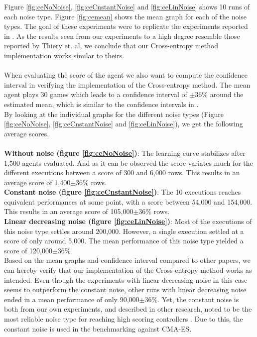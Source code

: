Figure \ref{fig:ceNoNoise}, \ref{fig:ceCnstantNoise} and
\ref{fig:ceLinNoise} shows 10 runs of each noise type. Figure
\ref{fig:cemean} shows the mean graph for each of the noise types.
The goal of these experiments were to replicate the experiments 
reported in \citep{thiery:09}. As the results seen from our experiments
to a high degree resemble those reported by Thiery et. al, we conclude
that our Cross-entropy method implementation works similar to theirs.\\
\\
When evaluating the score of the agent we also want to compute the confidence
interval in verifying the implementation of the Cross-entropy method. The mean agent plays 30 games
which leads to a confidence interval of $\pm36\%$ around the estimated mean,
which is similar to the confidence intervals in \citep{scherrer2009}.\\
By looking at the individual graphs for the different noise types 
(Figure \ref{fig:ceNoNoise}, \ref{fig:ceCnstantNoise} and
\ref{fig:ceLinNoise}), we get the following average scores.\\
\\
\textbf{Without noise (figure \ref{fig:ceNoNoise})}: The learning curve
stabilizes after 1,500 agents evaluated. And as it can be observed the
score variates much for the different executions between a score of 300 and 6,000
rows. This results in an average score of 1,400$\pm36\%$ rows.\\
\textbf{Constant noise (figure \ref{fig:ceCnstantNoise})}: 
The 10 executions reaches equivalent performances at some point, 
with a score between
54,000 and 154,000. This results in an average score of 105,000$\pm36\%$ rows.\\
\textbf{Linear decreasing noise (figure \ref{fig:ceLinNoise})}:
Most of the executions of this noise type settles around 200,000.
However, a single execution settled at a score of only around 5,000.
The mean performance of this noise type yielded a score of
120,000$\pm36\%$ \\

Based on the mean graphs and confidence interval compared to other papers, we can
hereby verify that our implementation of the Cross-entropy method works as intended. Even though the
experiments with linear decreasing noise in this case seems to outperform
the constant noise, other runs with linear decreasing noise ended in a mean 
performance of only 90,000$\pm36\%$. Yet, the constant noise is both from our
own experiments, and described in other research, noted to be the most reliable
noise type for reaching high scoring controllers \citep{scherrer2009}. 
Due to this, the constant noise is used in the 
benchmarking against CMA-ES.\\



